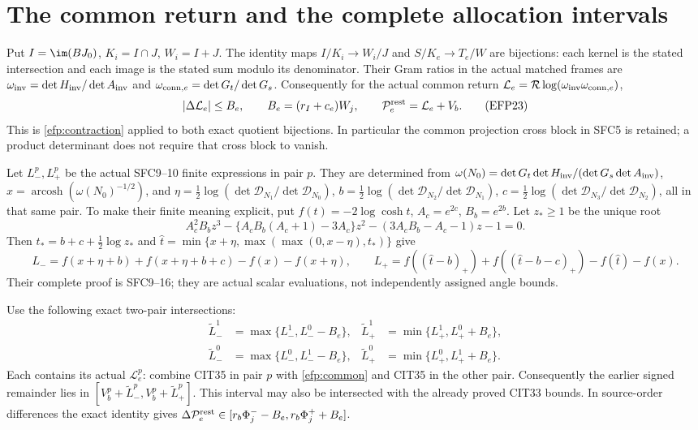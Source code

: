 \documentclass[11pt,a4paper]{article}
\begin{document}
\section{The common return and the complete allocation intervals}
Put $I=\im(BJ_0)$, $K_i=I\cap J$, $W_i=I+J$.
The identity maps $I/K_i\to W_i/J$ and $S/K_e\to T_e/W$ are
bijections: each kernel is the stated intersection and each image
is the stated sum modulo its denominator.
Their Gram ratios in the actual matched frames are
$\omega_{\rm inv}=\det H_{\rm inv}/\det A_{\rm inv}$ and
$\omega_{{\rm conn},e}=\det G_t/\det G_s$.
Consequently for the actual common return
$\mathcal L_e=\mathcal R\log(\omega_{\rm inv}\omega_{{\rm conn},e})$,
\[
|\Delta\mathcal L_e|\le B_e,\qquad
B_e=(r_I+c_e)W_j,\qquad
\mathcal P_e^{\rm rest}=\mathcal L_e+V_b .
\tag{EFP23}\label{efp:common}
\]
This is \eqref{efp:contraction} applied to both exact quotient
bijections. In particular the common projection cross block in
SFC5 is retained; a product determinant does not require that
cross block to vanish.

Let $L_-^p,L_+^p$ be the actual SFC9--10 finite expressions in pair
$p$. They are determined from
$\omega(N_0)=\det G_t\det H_{\rm inv}/(\det G_s\det A_{\rm inv})$,
$x=\operatorname{arcosh}(\omega(N_0)^{-1/2})$, and
$\eta=\tfrac12\log(\det\mathcal D_{N_1}/\det\mathcal D_{N_0})$,
$b=\tfrac12\log(\det\mathcal D_{N_2}/\det\mathcal D_{N_1})$,
$c=\tfrac12\log(\det\mathcal D_{N_3}/\det\mathcal D_{N_2})$,
all in that same pair. To make their finite meaning explicit, put
$f(t)=-2\log\cosh t$, $A_c=e^{2c}$, $B_b=e^{2b}$.
Let $z_*\ge1$ be the unique root
\[
A_c^2B_bz^3-\{A_cB_b(A_c+1)-3A_c\}z^2
 -(3A_cB_b-A_c-1)z-1=0.
\]
Then $t_*=b+c+\tfrac12\log z_*$ and
$\widehat t=\min\{x+\eta,\max(\max(0,x-\eta),t_*)\}$ give
\[
L_-=f(x+\eta+b)+f(x+\eta+b+c)-f(x)-f(x+\eta),\qquad
L_+=f((\widehat t-b)_+)+f((\widehat t-b-c)_+)-f(\widehat t)-f(x).
\]
Their complete proof is SFC9--16; they are actual scalar evaluations,
not independently assigned angle bounds.

Use the following exact two-pair intersections:
\[
\begin{aligned}
\widetilde L_-^1&=\max\{L_-^1,L_-^0-B_e\},&
\widetilde L_+^1&=\min\{L_+^1,L_+^0+B_e\},\\
\widetilde L_-^0&=\max\{L_-^0,L_-^1-B_e\},&
\widetilde L_+^0&=\min\{L_+^0,L_+^1+B_e\}.
\end{aligned}\tag{EFP24}\label{efp:angleintersection}
\]
Each contains its actual $\mathcal L_e^p$: combine CIT35 in pair
$p$ with \eqref{efp:common} and CIT35 in the other pair.
Consequently the earlier signed remainder lies in
$[V_b^p+\widetilde L_-^p,V_b^p+\widetilde L_+^p]$.
This interval may also be intersected with the already proved
CIT33 bounds. In source-order differences the exact identity gives
$\Delta\mathcal P_e^{\rm rest}\in
[r_b\Phi_j^--B_e,r_b\Phi_j^++B_e]$.
\end{document}
